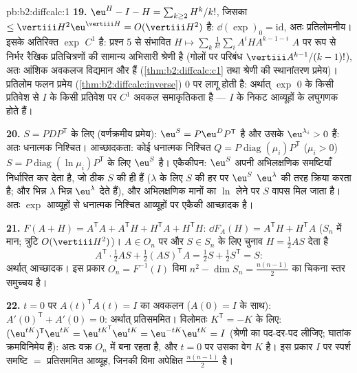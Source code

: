 \begin{solution}{pb:b2:diffcalc:1}
\textbf{19.} $\eu^H - I - H = \sum_{k\geq2}H^k/k!$, जिसका  $\leq \vertiii H^2\eu^{\vertiii H} = O(\vertiii H^2)$ है: $\dd(\exp)_0 = \mathrm{id}$, अतः प्रतिलोमनीय। इसके
अतिरिक्त $\exp$ $C^1$ है: प्रश्न 5 से संभावित  $H \mapsto
\sum_k\frac1{k!}\sum_iA^iHA^{k-1-i}$ $A$ पर  रूप से
निर्भर रैखिक प्रतिचित्रणों की सामान्य अभिसारी श्रेणी है (गोलों पर परिबंध
$\vertiii A^{k-1}/(k-1)!$), अतः आंशिक अवकलज विद्यमान और  हैं (\cref{thm:b2:diffcalc:c1} तथा श्रेणी की स्थानांतरण
प्रमेय)। प्रतिलोम फलन प्रमेय (\cref{thm:b2:diffcalc:inverse}) $0$ पर लागू होती है: अर्थात् $\exp$ $0$
के किसी प्रतिवेश से $I$ के किसी प्रतिवेश पर $C^1$ अवकल समाकृतिकता है ---
$I$ के निकट आव्यूहों के लघुगणक होते हैं।

\textbf{20.}  $S = PDP^{\mathsf T}$ के लिए (वर्णक्रमीय प्रमेय): $\eu^S = P\eu^DP^{\mathsf T}$  है और उसके
 $\eu^{\lambda_i} > 0$ हैं: अतः धनात्मक निश्चित। आच्छादकता: कोई धनात्मक
निश्चित $Q =
P\operatorname{diag}(\mu_i)P^{\mathsf T}$ ($\mu_i > 0$) $S = P\operatorname{diag}(\ln\mu_i)P^{\mathsf T}$ के लिए $\eu^S$ है। एकैकीपन: $\eu^S$ अपनी अभिलक्षणिक
समष्टियाँ निर्धारित कर देता है, जो ठीक $S$ की ही हैं ($\lambda$ के लिए $S$ की
हर  पर $\eu^S$ $\eu^\lambda$ की तरह क्रिया करता है; और भिन्न $\lambda$
भिन्न $\eu^\lambda$ देते हैं), और अभिलक्षणिक मानों का $\ln$ लेने पर $S$ वापस मिल
जाता है। अतः $\exp$  आव्यूहों से धनात्मक निश्चित आव्यूहों पर एकैकी
आच्छादक है।

\textbf{21.} $F(A + H) = A^{\mathsf T}A + A^{\mathsf T}H +
H^{\mathsf T}A + H^{\mathsf T}H$: $\dd F_A(H) =
A^{\mathsf T}H + H^{\mathsf T}A$ ($S_n$ में मान; त्रुटि $O(\vertiii H^2)$)। $A \in O_n$ पर और $S \in S_n$ के लिए
चुनाव $H = \frac12AS$ देता है
\[
A^{\mathsf T}\cdot\tfrac12AS + \tfrac12(AS)^{\mathsf T}A
= \tfrac12 S + \tfrac12 S^{\mathsf T} = S :
\]
अर्थात् आच्छादक। इस प्रकार $O_n = F^{-1}(I)$ विमा $n^2 - \dim S_n = \frac{n(n-1)}2$ का चिकना स्तर समुच्चय है।

\textbf{22.} $t
= 0$ पर $A(t)^{\mathsf T}A(t) = I$ का अवकलन ($A(0) = I$ के साथ): $A'(0)^{\mathsf T} + A'(0) = 0$: अर्थात् प्रतिसममित।
विलोमतः $K^{\mathsf T} = -K$ के लिए: $(\eu^{tK})^{\mathsf T}\eu^{tK} = \eu^{tK^{\mathsf T}}
\eu^{tK} = \eu^{-tK}\eu^{tK} = I$ (श्रेणी का पद-दर-पद  लीजिए; घातांक
क्रमविनिमेय हैं): अतः वक्र $O_n$ में बना रहता है, और $t = 0$ पर उसका वेग $K$
है। इस प्रकार $I$ पर स्पर्श समष्टि $=$ प्रतिसममित आव्यूह, जिनकी विमा
अपेक्षित $\frac{n(n-1)}2$ है।


\end{solution}

